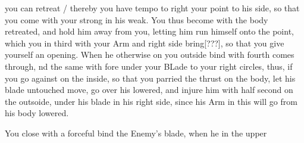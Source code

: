 you can retreat / thereby you have tempo to right your point to his
side, so that you come with your strong in his weak. You thus become
with the body retreated, and hold him away from you, letting him run
himself onto the point, which you in third with your Arm and right
side bring[???], so that you give yourself an opening.
When he otherwise on you outside bind with fourth comes through, nd
the same with fore under your BLade to your right circles, thus, if
you go against on the inside, so that you parried the thrust on the
body, let his blade untouched move, go over his lowered, and injure
him with half second on the outsoide, under his blade in his right
side, since his Arm in this will go from his body lowered.

You close with a forceful bind the Enemy's blade, when he in the upper